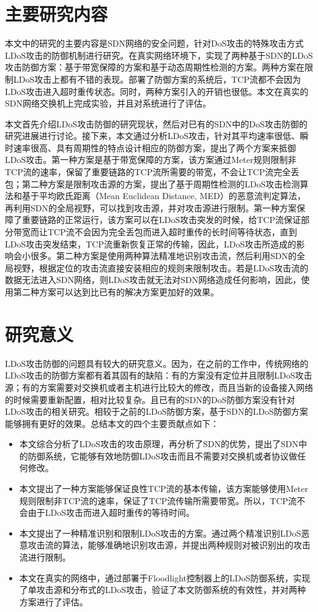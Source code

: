 \section{主要研究内容}
\label{sec:work}
本文中的研究的主要内容是SDN网络的安全问题，针对DoS攻击的特殊攻击方式LDoS攻击的防御机制进行研究。在真实网络环境下，实现了两种基于SDN的LDoS攻击防御方案：基于带宽保障的方案和基于动态周期性检测的方案。两种方案在限制LDoS攻击上都有不错的表现。部署了防御方案的系统后，TCP流都不会因为LDoS攻击进入超时重传状态。同时，两种方案引入的开销也很低。本文在真实的SDN网络交换机上完成实验，并且对系统进行了评估。

本文首先介绍LDoS攻击防御的研究现状，然后对已有的SDN中的DoS攻击防御的研究进展进行讨论。接下来，本文通过分析LDoS攻击，针对其平均速率很低、瞬时速率很高、具有周期性的特点设计相应的防御方案，提出了两个方案来抵御LDoS攻击。第一种方案是基于带宽保障的方案，该方案通过Meter规则限制非TCP流的速率，保留了重要链路的TCP流所需要的带宽，不会让TCP流完全丢包；第二种方案是限制攻击源的方案，提出了基于周期性检测的LDoS攻击检测算法和基于平均欧氏距离（Mean Euclidean Distance, MED）的恶意流判定算法，再利用SDN的全局视野，可以找到攻击源，并对攻击源进行限制。第一种方案保障了重要链路的正常运行，该方案可以在LDoS攻击突发的时候，给TCP流保证部分带宽而让TCP流不会因为完全丢包而进入超时重传的长时间等待状态，直到LDoS攻击突发结束，TCP流重新恢复正常的传输，因此，LDoS攻击所造成的影响会小很多。第二种方案是使用两种算法精准地识别攻击流，然后利用SDN的全局视野，根据定位的攻击流直接安装相应的规则来限制攻击。若是LDoS攻击流的数据无法进入SDN网络，则LDoS攻击就无法对SDN网络造成任何影响，因此，使用第二种方案可以达到比已有的解决方案更加好的效果。


\section{研究意义}
\label{sec:contribution}
LDoS攻击防御的问题具有较大的研究意义。因为，在之前的工作中，传统网络的LDoS攻击的防御方案都有着其固有的缺陷：有的方案没有定位并且限制LDoS攻击源；有的方案需要对交换机或者主机进行比较大的修改，而且当新的设备接入网络的时候需要重新配置，相对比较复杂。且已有的SDN的DoS防御方案没有针对LDoS攻击的相关研究。相较于之前的LDoS防御方案，基于SDN的LDoS防御方案能够拥有更好的效果。总结本文的四个主要贡献点如下：

\begin{itemize}
    \item 本文综合分析了LDoS攻击的攻击原理，再分析了SDN的优势，提出了SDN中的防御系统，它能够有效地防御LDoS攻击而且不需要对交换机或者协议做任何修改。
    \item 本文提出了一种方案能够保证良性TCP流的基本传输，该方案能够使用Meter规则限制非TCP流的速率，保证了TCP流传输所需要带宽。所以，TCP流不会由于LDoS攻击而进入超时重传的等待时间。
    \item 本文提出了一种精准识别和限制LDoS攻击的方案。通过两个精准识别LDoS恶意攻击流的算法，能够准确地识别攻击源，并提出两种规则对被识别出的攻击流进行限制。
    \item 本文在真实的网络中，通过部署于Floodlight控制器上的LDoS防御系统，实现了单攻击源和分布式的LDoS攻击，验证了本文防御系统的有效性，并对两种方案进行了评估。
\end{itemize}

